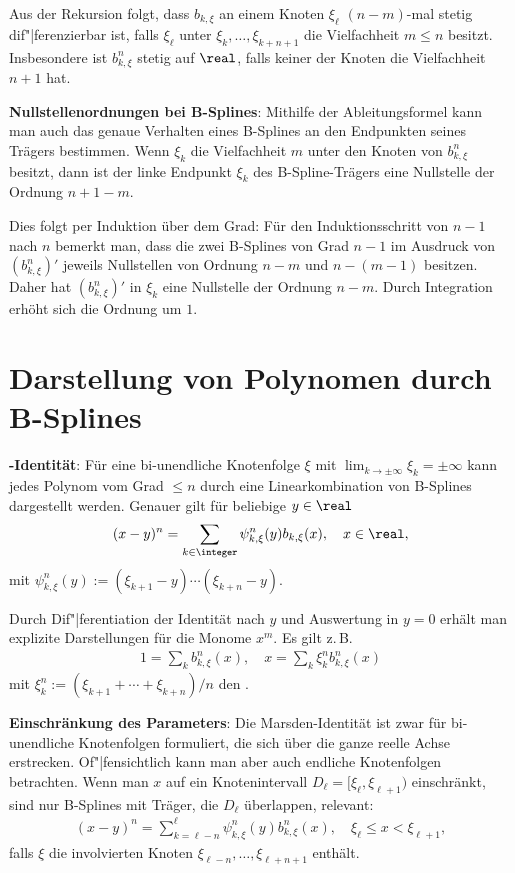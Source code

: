 Aus der Rekursion folgt, dass $b_{k,\xi}$ an einem Knoten $\xi_\ell$
$(n - m)$-mal stetig dif"|ferenzierbar ist, falls $\xi_\ell$ unter $\xi_k, \dotsc, \xi_{k+n+1}$
die Vielfachheit $m \le n$ besitzt.
Insbesondere ist $b_{k,\xi}^n$ stetig auf $\real$, falls keiner der Knoten die Vielfachheit
$n + 1$ hat.

\linie

\textbf{Nullstellenordnungen bei B-Splines}:
Mithilfe der Ableitungsformel kann man auch das genaue Verhalten eines B-Splines an den Endpunkten
seines Trägers bestimmen.
Wenn $\xi_k$ die Vielfachheit $m$ unter den Knoten von $b_{k,\xi}^n$ besitzt, dann ist der
linke Endpunkt $\xi_k$ des B-Spline-Trägers eine Nullstelle der Ordnung $n + 1 - m$.

Dies folgt per Induktion über dem Grad:
Für den Induktionsschritt von $n - 1$ nach $n$ bemerkt man, dass die zwei B-Splines von Grad
$n - 1$ im Ausdruck von $(b_{k,\xi}^n)'$ jeweils Nullstellen von Ordnung $n - m$ und $n - (m - 1)$
besitzen.
Daher hat $(b_{k,\xi}^n)'$ in $\xi_k$ eine Nullstelle der Ordnung $n - m$.
Durch Integration erhöht sich die Ordnung um $1$.

\section{%
    Darstellung von Polynomen durch B-Splines%
}

\textbf{-Identität}:
Für eine bi-unendliche Knotenfolge $\xi$ mit $\lim_{k \to \pm\infty} \xi_k = \pm\infty$
kann jedes Polynom vom Grad $\le n$ durch eine Linearkombination von B-Splines dargestellt werden.
Genauer gilt für beliebige $y \in \real$
\begin{align*}
    (x - y)^n = \sum_{k \in \integer} \psi_{k,\xi}^n(y) b_{k,\xi}(x),\quad x \in \real,
\end{align*}
mit $\psi_{k,\xi}^n(y) := (\xi_{k+1} - y) \dotsm (\xi_{k+n} - y)$.

Durch Dif"|ferentiation der Identität nach $y$ und Auswertung in $y = 0$ erhält man explizite
Darstellungen für die Monome $x^m$.
Es gilt z.\,B.
\begin{align*}
    1 = \sum_k b_{k,\xi}^n(x),\quad
    x = \sum_k \xi_k^n b_{k,\xi}^n(x)
\end{align*}
mit $\xi_k^n := (\xi_{k+1} + \dotsb + \xi_{k+n})/n$ den .

\linie
\pagebreak

\textbf{Einschränkung des Parameters}:
Die Marsden-Identität ist zwar für bi-unendliche Knotenfolgen formuliert, die sich über die ganze
reelle Achse erstrecken.
Of"|fensichtlich kann man aber auch endliche Knotenfolgen betrachten.
Wenn man $x$ auf ein Knotenintervall $D_\ell = [\xi_\ell, \xi_{\ell+1})$ einschränkt,
sind nur B-Splines mit Träger, die $D_\ell$ überlappen, relevant:
\begin{align*}
    (x - y)^n = \sum_{k=\ell-n}^\ell \psi_{k,\xi}^n(y) b_{k,\xi}^n(x),\quad
    \xi_\ell \le x < \xi_{\ell+1},
\end{align*}
falls $\xi$ die involvierten Knoten $\xi_{\ell-n}, \dotsc, \xi_{\ell+n+1}$ enthält.


